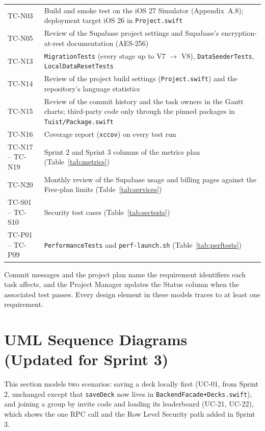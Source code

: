 \documentclass[12pt,letterpaper]{article}
\begin{document}
\begin{xltabular}{\textwidth}{@{}L{2.4cm} Y@{}}
TC-N03 & Build and smoke test on the iOS 27 Simulator (Appendix~A.8); deployment target iOS 26 in \texttt{Project.swift} \\
TC-N05 & Review of the Supabase project settings and Supabase's encryption-at-rest documentation (AES-256) \\
TC-N13 & \texttt{MigrationTests} (every stage up to V7 $\to$ V8), \texttt{DataSeederTests}, \texttt{LocalDataResetTests} \\
TC-N14 & Review of the project build settings (\texttt{Project.swift}) and the repository's language statistics \\
TC-N15 & Review of the commit history and the task owners in the Gantt charts; third-party code only through the pinned packages in \texttt{Tuist/Package.swift} \\
TC-N16 & Coverage report (\texttt{xccov}) on every test run \\
TC-N17 -- TC-N19 & Sprint 2 and Sprint 3 columns of the metrics plan (Table~\ref{tab:metrics}) \\
TC-N20 & Monthly review of the Supabase usage and billing pages against the Free-plan limits (Table~\ref{tab:services}) \\
TC-S01 -- TC-S10 & Security test cases (Table~\ref{tab:sectests}) \\
TC-P01 -- TC-P09 & \texttt{PerformanceTests} and \texttt{perf-launch.sh} (Table~\ref{tab:perftests}) \\
\end{xltabular}

Commit messages and the project plan name the requirement identifiers each task
affects, and the Project Manager updates the Status column when the associated test passes. Every design element
in these models traces to at least one requirement.

\section{UML Sequence Diagrams (Updated for Sprint 3)}
This section models two scenarios: saving a deck locally first (UC-01, from Sprint 2,
unchanged except that \texttt{saveDeck} now lives in \texttt{BackendFacade+Decks.swift}),
and joining a group by invite code and loading its leaderboard (UC-21, UC-22), which
shows the one RPC call and the Row Level Security path added in Sprint 3.
\end{document}
